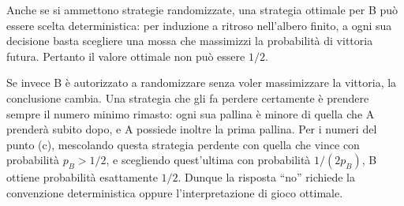 {Anche se si ammettono strategie randomizzate, una strategia ottimale per B può essere scelta deterministica: per induzione a ritroso nell'albero finito, a ogni sua decisione basta scegliere una mossa che massimizzi la probabilità di vittoria futura. Pertanto il valore ottimale non può essere $1/2$.

Se invece B è autorizzato a randomizzare senza voler massimizzare la vittoria, la conclusione cambia. Una strategia che gli fa perdere certamente è prendere sempre il numero minimo rimasto: ogni sua pallina è minore di quella che A prenderà subito dopo, e A possiede inoltre la prima pallina. Per i numeri del punto (c), mescolando questa strategia perdente con quella che vince con probabilità $p_B>1/2$, e scegliendo quest'ultima con probabilità $1/(2p_B)$, B ottiene probabilità esattamente $1/2$. Dunque la risposta ``no'' richiede la convenzione deterministica oppure l'interpretazione di gioco ottimale.
}
